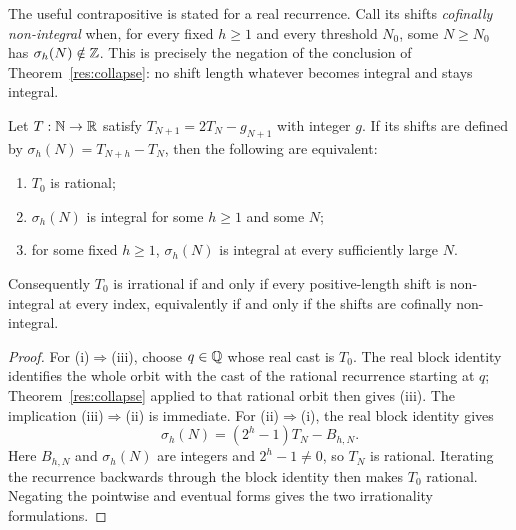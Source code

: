 \documentclass[11pt]{article}
\begin{document}
The useful contrapositive is stated for a real recurrence.  Call its shifts
\emph{cofinally non-integral} when, for every fixed $h\ge1$ and every
threshold $N_0$, some $N\ge N_0$ has $\sigma_h(N)\notin\mathbb{Z}$.  This is precisely
the negation of the conclusion of Theorem~\ref{res:collapse}: no shift length
whatever becomes integral and stays integral.

\begin{theorem}\label{res:escape-irrational}
Let $T:\mathbb{N}\to\mathbb{R}$ satisfy $T_{N+1}=2T_N-g_{N+1}$ with integer $g$.  If its
shifts are defined by $\sigma_h(N)=T_{N+h}-T_N$, then the following are
equivalent:
\begin{enumerate}[label=\textup{(\roman*)}]
\item $T_0$ is rational;
\item $\sigma_h(N)$ is integral for some $h\ge1$ and some $N$;
\item for some fixed $h\ge1$, $\sigma_h(N)$ is integral at every sufficiently
  large $N$.
\end{enumerate}
Consequently $T_0$ is irrational if and only if every positive-length shift
is non-integral at every index, equivalently if and only if the shifts are
cofinally non-integral.
\end{theorem}

\begin{proof}
For \textup{(i)}$\Rightarrow$\textup{(iii)}, choose $q\in\mathbb{Q}$ whose real cast
is $T_0$.  The real block identity identifies the whole orbit with the cast of
the rational recurrence starting at $q$; Theorem~\ref{res:collapse} applied to
that rational orbit then gives \textup{(iii)}.  The implication
\textup{(iii)}$\Rightarrow$\textup{(ii)} is immediate.  For
\textup{(ii)}$\Rightarrow$\textup{(i)}, the real block identity gives
\[
 \sigma_h(N)=(2^h-1)T_N-B_{h,N}.
\]
Here $B_{h,N}$ and $\sigma_h(N)$ are integers and $2^h-1\ne0$, so $T_N$ is
rational.  Iterating the recurrence backwards through the block identity then
makes $T_0$ rational.  Negating the pointwise and eventual forms gives the two
irrationality formulations.
\end{proof}
\end{document}
